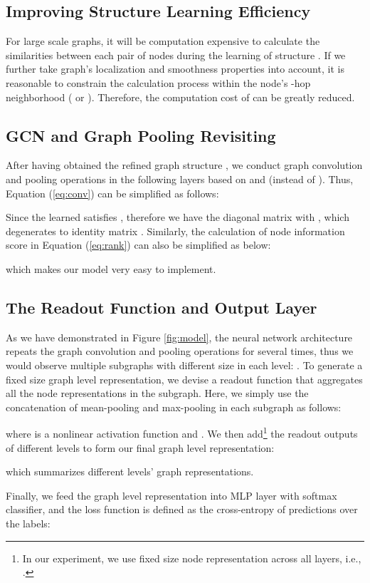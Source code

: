 \documentclass[letterpaper]{article} \usepackage{aaai20}  \usepackage{times}  \usepackage{helvet} \usepackage{courier}  \usepackage[hyphens]{url}  \usepackage{graphicx} \urlstyle{rm} \def\UrlFont{\rm}  \usepackage{graphicx}  \frenchspacing  \setlength{\pdfpagewidth}{8.5in}  \setlength{\pdfpageheight}{11in}
\begin{document}
\subsection{Improving Structure Learning Efficiency}
For large scale graphs, it will be computation expensive to calculate the similarities between each pair of nodes during the learning of structure . If we further take graph's localization and smoothness properties into account, it is reasonable to constrain the calculation process within the node's -hop neighborhood ( or ). Therefore, the computation cost of  can be greatly reduced. 

\subsection{GCN and Graph Pooling Revisiting}
After having obtained the refined graph structure , we conduct graph convolution and pooling operations in the following layers based on  and  (instead of ). Thus, Equation (\ref{eq:conv}) can be simplified as follows:

Since the learned  satisfies , therefore we have the diagonal matrix  with , which degenerates to identity matrix . Similarly, the calculation of node information score in Equation (\ref{eq:rank}) can also be simplified as below:

which makes our model very easy to implement.

\subsection{The Readout Function and Output Layer}
As we have demonstrated in Figure \ref{fig:model}, the neural network architecture repeats the graph convolution and pooling operations for several times, thus we would observe multiple subgraphs with different size in each level: . To generate a fixed size graph level representation, we devise a readout function that aggregates all the node representations in the subgraph. Here, we simply use the concatenation of mean-pooling and max-pooling in each subgraph as follows:

where  is a nonlinear activation function and . We then add\footnote{In our experiment, we use fixed size node representation across all layers, i.e., .} the readout outputs of different levels to form our final graph level representation:

which summarizes different levels' graph representations. 

Finally, we feed the graph level representation into MLP layer with softmax classifier, and the loss function is defined as the cross-entropy of predictions over the labels:
\end{document}
